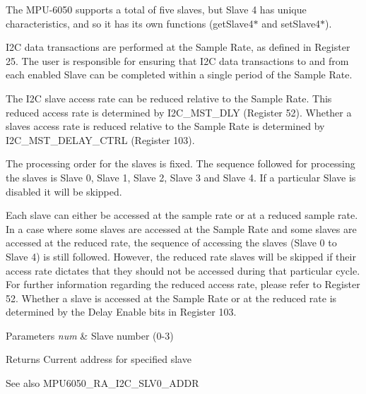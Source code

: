 The M\+P\+U-\/6050 supports a total of five slaves, but Slave 4 has unique characteristics, and so it has its own functions (get\+Slave4$\ast$ and set\+Slave4$\ast$).

I2C data transactions are performed at the Sample Rate, as defined in Register 25. The user is responsible for ensuring that I2C data transactions to and from each enabled Slave can be completed within a single period of the Sample Rate.

The I2C slave access rate can be reduced relative to the Sample Rate. This reduced access rate is determined by I2\+C\+\_\+\+M\+S\+T\+\_\+\+D\+LY (Register 52). Whether a slave\textquotesingle{}s access rate is reduced relative to the Sample Rate is determined by I2\+C\+\_\+\+M\+S\+T\+\_\+\+D\+E\+L\+A\+Y\+\_\+\+C\+T\+RL (Register 103).

The processing order for the slaves is fixed. The sequence followed for processing the slaves is Slave 0, Slave 1, Slave 2, Slave 3 and Slave 4. If a particular Slave is disabled it will be skipped.

Each slave can either be accessed at the sample rate or at a reduced sample rate. In a case where some slaves are accessed at the Sample Rate and some slaves are accessed at the reduced rate, the sequence of accessing the slaves (Slave 0 to Slave 4) is still followed. However, the reduced rate slaves will be skipped if their access rate dictates that they should not be accessed during that particular cycle. For further information regarding the reduced access rate, please refer to Register 52. Whether a slave is accessed at the Sample Rate or at the reduced rate is determined by the Delay Enable bits in Register 103.


\begin{DoxyParams}{Parameters}
{\em num} & Slave number (0-\/3) \\
\hline
\end{DoxyParams}
\begin{DoxyReturn}{Returns}
Current address for specified slave 
\end{DoxyReturn}
\begin{DoxySeeAlso}{See also}
M\+P\+U6050\+\_\+\+R\+A\+\_\+\+I2\+C\+\_\+\+S\+L\+V0\+\_\+\+A\+D\+DR 
\end{DoxySeeAlso}
\mbox{\label{class_m_p_u6050_a54c2a48b3cb79106bcaf75accf6cd311}} 
